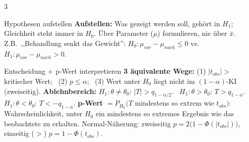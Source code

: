 \documentclass[8pt,a4paper,landscape]{extarticle}
\begin{document}
\begin{multicols*}{3}
\begin{wissen}{Hypothesen aufstellen}
\textbf{Aufstellen:} Was gezeigt werden soll, gehört in $H_1$; Gleichheit steht immer in $H_0$. Über Parameter ($\mu$) formulieren, nie über $\bar x$. Z.B.\ ,,Behandlung senkt das Gewicht'': $H_0:\mu_{vor}-\mu_{nach}\le 0$ vs.\ $H_1:\mu_{vor}-\mu_{nach}>0$.
\end{wissen}
\begin{rechnen}{Entscheidung + p-Wert interpretieren}
\textbf{3 äquivalente Wege:} (1) $|t_{obs}|>$ kritischer Wert; \ (2) $p\le\alpha$; \ (3) Wert unter $H_0$ liegt nicht im $(1-\alpha)$-KI (zweiseitig).
\textbf{Ablehnbereich:} $H_1:\theta\neq\theta_0$: $|T|>q_{1-\alpha/2}$. \ $H_1:\theta>\theta_0$: $T>q_{1-\alpha}$. \ $H_1:\theta<\theta_0$: $T<-q_{1-\alpha}$.
\textbf{p-Wert} $=P_{H_0}(T$ mindestens so extrem wie $t_{obs})$: Wahrscheinlichkeit, unter $H_0$ ein mindestens so extremes Ergebnis wie das beobachtete zu erhalten. Normal-Näherung: zweiseitig $p=2\big(1-\Phi(|t_{obs}|)\big)$, einseitig ($>$) $p=1-\Phi(t_{obs})$.
\end{rechnen}


\end{multicols*}
\end{document}
